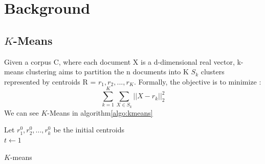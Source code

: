 \section{Background}\label{sec:related}
\subsection{$K$-Means}
Given a corpus C, where each document X is a 
d-dimensional real vector, k-means clustering aims to partition the n 
documents into K $S_k$ clusters represented by centroids 
R = {$r_1, r_2, ..., r_K$}.
Formally, the objective is to minimize :
$$
\sum\limits_{k =1 }^K \sum\limits_{X \in S_k} ||X - r_k||_2^2
$$
We can see $K$-Means in algorithm\ref{algo:kmeans}
\begin{algorithm}
  Let $r_1^{0}, r_2^{0} , ..., r_k^{0}$ be the initial centroids\\
  $t \gets 1$\\
  \caption{\label{algo:kmeans}$K$-means}
\end{algorithm}

